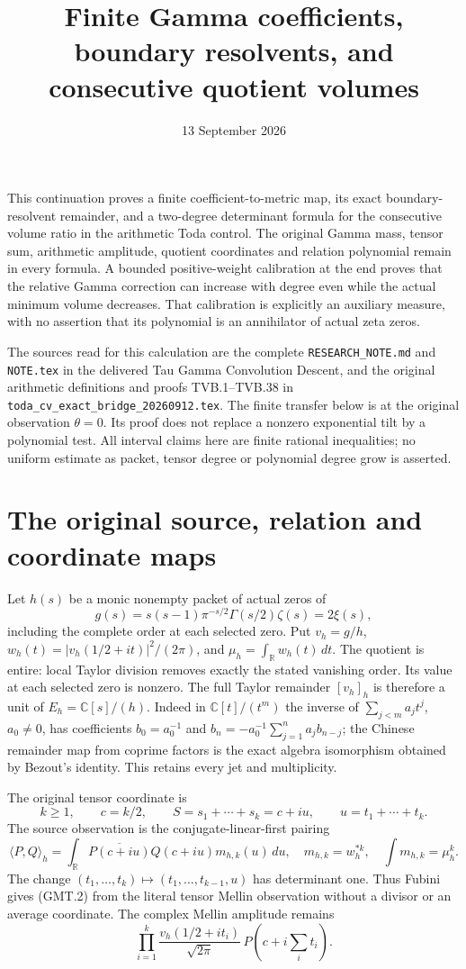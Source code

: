 \documentclass[11pt]{article}
\title{Finite Gamma coefficients, boundary resolvents, and consecutive quotient volumes}
\author{}
\date{13 September 2026}
\newcommand{\C}{\mathbb C}
\newcommand{\R}{\mathbb R}
\begin{document}
\maketitle

This continuation proves a finite coefficient-to-metric map, its exact
boundary-resolvent remainder, and a two-degree determinant formula for
the consecutive volume ratio in the arithmetic Toda control. The original
Gamma mass, tensor sum, arithmetic amplitude, quotient coordinates and
relation polynomial remain in every formula. A bounded positive-weight
calibration at the end proves that the relative Gamma correction can
increase with degree even while the actual minimum volume decreases.
That calibration is explicitly an auxiliary measure, with no assertion
that its polynomial is an annihilator of actual zeta zeros.

The sources read for this calculation are the complete
\texttt{RESEARCH\_NOTE.md} and \texttt{NOTE.tex} in the delivered
Tau Gamma Convolution Descent, and the original arithmetic definitions and proofs
TVB.1--TVB.38 in \texttt{toda\_cv\_exact\_bridge\_20260912.tex}.
The finite transfer below is at the original observation $\theta=0$.
Its proof does not replace a nonzero exponential tilt by a polynomial
test. All interval claims here are finite rational inequalities; no
uniform estimate as packet, tensor degree or polynomial degree grow is
asserted.

\section{The original source, relation and coordinate maps}

Let $h(s)$ be a monic nonempty packet of actual zeros of
\[
 g(s)=s(s-1)\pi^{-s/2}\Gamma(s/2)\zeta(s)=2\xi(s),
\]
including the complete order at each selected zero. Put $v_h=g/h$,
$w_h(t)=|v_h(1/2+it)|^2/(2\pi)$, and $\mu_h=\int_\R w_h(t)\,dt$.
The quotient is entire: local Taylor division removes exactly the stated
vanishing order. Its value at each selected zero is nonzero. The full
Taylor remainder $[v_h]_h$ is therefore a unit of $E_h=\C[s]/(h)$.
Indeed in $\C[t]/(t^m)$ the inverse of $\sum_{j<m}a_jt^j$, $a_0\ne0$,
has coefficients $b_0=a_0^{-1}$ and
$b_n=-a_0^{-1}\sum_{j=1}^n a_jb_{n-j}$; the Chinese remainder map
from coprime factors is the exact algebra isomorphism obtained by
Bezout's identity. This retains every jet and multiplicity.

The original tensor coordinate is
\[
 k\ge1,\qquad c=k/2,\qquad S=s_1+\cdots+s_k=c+iu,
 \qquad u=t_1+\cdots+t_k.                                      \tag{GMT.1}
\]
The source observation is the conjugate-linear-first pairing
\[
 \langle P,Q\rangle_h=\int_\R
       \overline{P(c+iu)}Q(c+iu)m_{h,k}(u)\,du,
 \quad m_{h,k}=w_h^{*k},\quad\int m_{h,k}=\mu_h^k.                \tag{GMT.2}
\]
The change $(t_1,\ldots,t_k)\mapsto
(t_1,\ldots,t_{k-1},u)$ has determinant one. Thus Fubini gives (GMT.2)
from the literal tensor Mellin observation without a divisor or an
average coordinate. The complex Mellin amplitude remains
\[
 \prod_{i=1}^k\frac{v_h(1/2+it_i)}{\sqrt{2\pi}}\,
 P(c+i\textstyle\sum_i t_i).
\]
\end{document}
